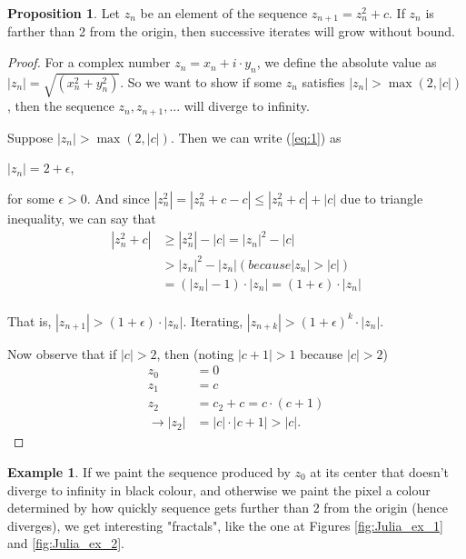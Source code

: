 \documentclass[a4paper,11pt]{article}
\theoremstyle{definition}
\newtheorem{prop}[defn]{Proposition}
\newtheorem{exmp}[defn]{Example}
\numberwithin{equation}{section} %
\begin{document}
\begin{prop}
    Let $z_n$ be an element of the sequence $z_{n+1} = z_n^2 + c$. If $z_n$ is farther than 2 from the origin, then successive iterates will grow without bound.
\end{prop}
\begin{proof}
    For a complex number $z_n = x_n + i \cdot y_n$, we define the absolute value as $|z_n| = \sqrt{(x_n^2 + y_n^2)}$. So we want to show if some $z_n$ satisfies $|z_n| > \max (2, |c|)$, then the sequence $z_n, z_{n+1},...$ will diverge to infinity. 

    Suppose $|z_n| > \max (2, |c|)$. Then we can write (\ref{eq:1}) as 
    \begin{center}
        $|z_n| = 2 + \epsilon$,
    \end{center}
    for some $\epsilon > 0$. And since $|z_n^2| = |z_n^2 + c - c| \le |z_n^2 + c| + |c|$ due to triangle inequality, we can say that
    \begin{align*}
        |z_n^2 + c| &\ge |z_n^2| - |c| = |z_n|^2 - |c| \\
        &> |z_n|^2 - |z_n| (because |z_n| > |c|) \\
        &= (|z_n| - 1)\cdot|z_n| = (1 + \epsilon)\cdot|z_n| \\
    \end{align*}

    That is, $|z_{n+1}| > (1 + \epsilon)\cdot|z_n|$. Iterating, $|z_{n+k}| > (1 + \epsilon)^k\cdot|z_n|$.

    Now observe that if $|c| > 2$, then (noting $|c + 1| > 1$ because $|c| > 2$)
    \begin{align*}
            z_0 &= 0 \\
            z_1 &= c \\
            z_2 &= c_2 + c = c\cdot(c + 1) \\
            \rightarrow |z_2| &= |c|\cdot|c + 1| > |c|.
    \end{align*} 
    
\end{proof}


\begin{exmp}
    If we paint the sequence produced by $z_0$ at its center that doesn't diverge to infinity in black colour, and otherwise we paint the pixel a colour determined by how quickly sequence gets further than 2 from the origin (hence diverges), we get interesting "fractals", like the one at Figures \ref{fig:Julia_ex_1} and \ref{fig:Julia_ex_2}.
\end{exmp}
\end{document}
